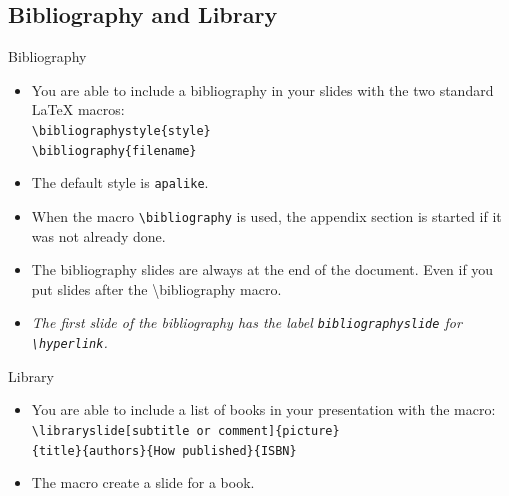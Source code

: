 \documentclass[english,circlenumberstyle]{irtesbeamer}
\begin{document}
\subsection{Bibliography and Library}
\begin{frame}{Bibliography}
	\begin{itemize}
	\item You are able to include a bibliography in your slides with the two standard {\LaTeX} macros: \\
		\texttt{{\textbackslash}bibliographystyle\{style\}} \\
		\texttt{{\textbackslash}bibliography\{filename\}}
	\item The default style is \texttt{apalike}.
	\item When the macro \texttt{{\textbackslash}bibliography} is used, the appendix section is started if it was not already done.
	\item The bibliography slides are \alert{always} at the end of the document. Even if you put slides after the {\textbackslash}bibliography macro.
	\item \emph{The first slide of the bibliography has the label \texttt{bibliographyslide} for \texttt{{\textbackslash}hyperlink}.}
	\end{itemize}
\end{frame}

\begin{frame}{Library}
	\begin{itemize}
	\item You are able to include a list of books in your presentation with the macro: \\
		\texttt{{\textbackslash}libraryslide[subtitle or comment]\{picture\}} \\
		\texttt{\{title\}\{authors\}\{How published\}\{ISBN\}}
	\item The macro create a slide for a book.
	\end{itemize}
\end{frame}
\end{document}
